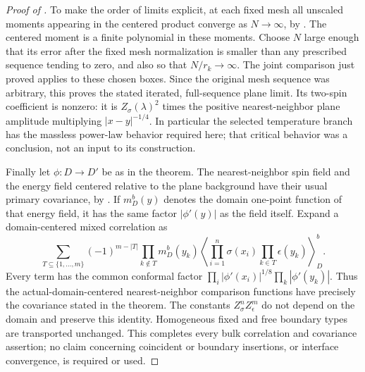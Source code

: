 \begin{proof}[Proof of ]
To make the order of limits explicit, at each fixed mesh all unscaled
moments appearing in the centered product converge as $N\to\infty$,
by . The centered moment is a finite polynomial in
these moments. Choose $N$ large enough that its error after the fixed
mesh normalization is smaller than any prescribed sequence tending
to zero, and also so that $N/r_k\to\infty$. The joint comparison just
proved applies to these chosen boxes. Since the original mesh
sequence was arbitrary, this proves the stated iterated, full-sequence
plane limit. Its two-spin coefficient is nonzero: it is
$Z_\sigma(\lambda)^2$ times the positive nearest-neighbor plane
amplitude multiplying $|x-y|^{-1/4}$. In particular the selected
temperature branch has the massless power-law behavior required here;
that critical behavior was a conclusion, not an input to its
construction.

Finally let $\phi:D\to D'$ be as in the theorem. The nearest-neighbor
spin field and the energy field centered relative to the plane
background have their usual primary covariance, by .
If $m_D^b(y)$ denotes the domain one-point function of that energy
field, it has the same factor $|\phi'(y)|$ as the field itself.
Expand a domain-centered mixed correlation as
\[
 \sum_{T\subseteq\{1,\ldots,m\}}
   (-1)^{m-|T|}
   \prod_{k\notin T}m_D^b(y_k)
   \left\langle
     \prod_{i=1}^n\sigma(x_i)
     \prod_{k\in T}\epsilon(y_k)
   \right\rangle_D^b.
\]
Every term has the common conformal factor
$\prod_i|\phi'(x_i)|^{1/8}\prod_k|\phi'(y_k)|$.
Thus the actual-domain-centered nearest-neighbor comparison functions
have precisely the covariance stated in the theorem. The constants
$Z_\sigma^nZ_\epsilon^m$ do not depend on the domain and preserve this
identity. Homogeneous fixed and free boundary types are transported
unchanged. This completes every bulk correlation and covariance
assertion; no claim concerning coincident or boundary insertions, or
interface convergence, is required or used.
\end{proof}
